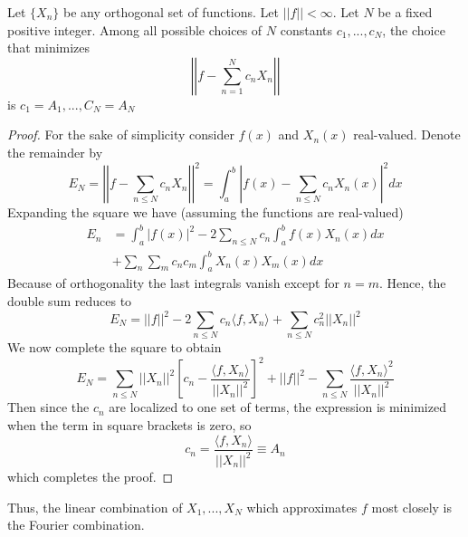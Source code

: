 \begin{theorem}
    Let $\{X_n\}$ be any orthogonal set of functions. Let $||f|| < \infty$. Let $N$ be a fixed positive integer. Among all possible choices of $N$ constants $c_1,...,c_N$, the choice that minimizes \begin{equation*}
        \left|\left|f-\sum_{n=1}^Nc_nX_n\right|\right|
    \end{equation*}
    is $c_1=A_1,...,C_N=A_N$
\end{theorem}
\begin{proof}
    For the sake of simplicity consider $f(x)$ and $X_n(x)$ real-valued. Denote the remainder by \begin{equation*}
        E_N = \left|\left|f - \sum_{n\leq N}c_nX_n\right|\right|^2 = \int_a^b\left|f(x) - \sum_{n\leq N}c_nX_n(x)\right|^2dx
    \end{equation*}
    Expanding the square we have (assuming the functions are real-valued) \begin{align*}
        E_n &= \int_a^b|f(x)|^2 - 2\sum_{n\leq N}c_n\int_a^bf(x)X_n(x)dx \\
        &+\sum_n\sum_mc_nc_m\int_a^bX_n(x)X_m(x)dx
    \end{align*}
    Because of orthogonality the last integrals vanish except for $n = m$. Hence, the double sum reduces to \begin{equation*}
        E_N = ||f||^2 - 2\sum_{n\leq N}c_n\langle f,X_n\rangle + \sum_{n\leq N}c_n^2||X_n||^2
    \end{equation*}
    We now complete the square to obtain \begin{equation*}
        E_N = \sum_{n\leq N}||X_n||^2\left[c_n - \frac{\langle f,X_n\rangle}{||X_n||^2}\right]^2+||f||^2 - \sum_{n\leq N}\frac{\langle f,X_n\rangle^2}{||X_n||^2}
    \end{equation*}
    Then since the $c_n$ are localized to one set of terms, the expression is minimized when the term in square brackets is zero, so \begin{equation*}
        c_n = \frac{\langle f,X_n\rangle}{||X_n||^2} \equiv A_n
    \end{equation*}
    which completes the proof.
\end{proof}

Thus, the linear combination of $X_1,...,X_N$ which approximates $f$ most closely is the Fourier combination.

